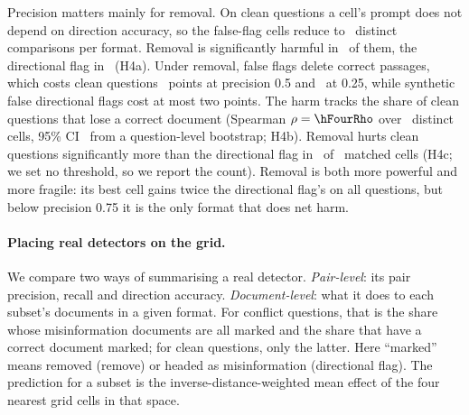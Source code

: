 Precision matters mainly for removal. On clean questions a cell's prompt does not depend
on direction accuracy, so the false-flag cells reduce to \hFourRemN\ distinct comparisons per format. Removal is
significantly harmful in \hFourRemHarm\ of them, the directional flag in \hFourDirHarm\ (H4a). Under removal, false flags
delete correct passages, which costs clean questions \agRemHalfDOneClean\ points at precision 0.5 and
\agRemQuDOneClean\ at 0.25, while synthetic false directional flags cost at most two points. The harm tracks the
share of clean questions that lose a correct document (Spearman $\rho=\hFourRho$ over \hFourRhoCells\ distinct
cells, 95\% CI \hFourRhoCI\ from a question-level bootstrap; H4b). Removal hurts clean questions significantly more
than the directional flag in \hFourRemWorse\ of \hFourMatched\ matched cells (H4c; we set no threshold, so we report
the count). Removal is both more powerful and more fragile: its best cell gains twice the directional
flag's on all questions, but below precision 0.75 it is the only format that does net harm.


\paragraph{Placing real detectors on the grid.}
\label{sec:placement}
We compare two ways of summarising a real
detector. \emph{Pair-level}: its pair precision, recall and direction accuracy. \emph{Document-level}: what it does
to each subset's documents in a given format. For conflict questions, that is the share whose misinformation documents
are all marked and the share that have a correct document marked; for clean questions, only the latter. Here ``marked'' means removed (remove) or headed as misinformation (directional flag). The prediction
for a subset is the inverse-distance-weighted mean effect of the four nearest grid cells in that space.

